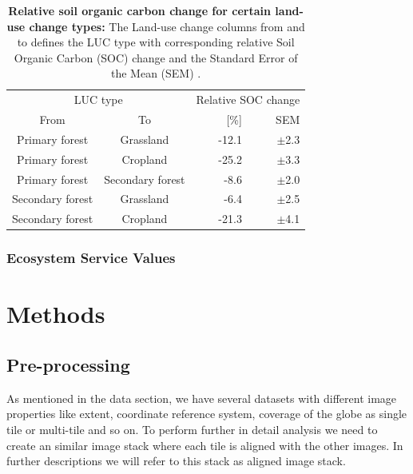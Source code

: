 			\begin{table}[ht]
				\centering
				\caption[Relative soil organic carbon change for certain land-use change types]{\textbf{Relative soil organic carbon change for certain land-use change types:} The Land-use change columns from and to defines the LUC type with corresponding relative Soil Organic Carbon (SOC) change and the Standard Error of the Mean (SEM) \citep{Don2010}.}
				\label{tab:soc}
				\begin{tabular}{ccrr}
					\hline
					\multicolumn{2}{c}{LUC type} & \multicolumn{2}{c}{Relative SOC change} \\
					From & To & [\%] & SEM \\\hline
					Primary forest & Grassland & -12.1 & $\pm$2.3 \\
					Primary forest & Cropland & -25.2 & $\pm$3.3 \\
					Primary forest & Secondary forest & -8.6 & $\pm$2.0 \\
					Secondary forest & Grassland & -6.4 & $\pm$2.5 \\
					Secondary forest & Cropland & -21.3 & $\pm$4.1 \\\hline
				\end{tabular}
			\end{table}

		\subsubsection{Ecosystem Service Values}


\section{Methods}
\label{sec:methods}
	\subsection{Pre-processing}
		As mentioned in the data section, we have several datasets with different image properties like extent, coordinate reference system, coverage of the globe as single tile or multi-tile and so on. To perform further in detail analysis we need to create an similar image stack where each tile is aligned with the other images. In further descriptions we will refer to this stack as aligned image stack.

